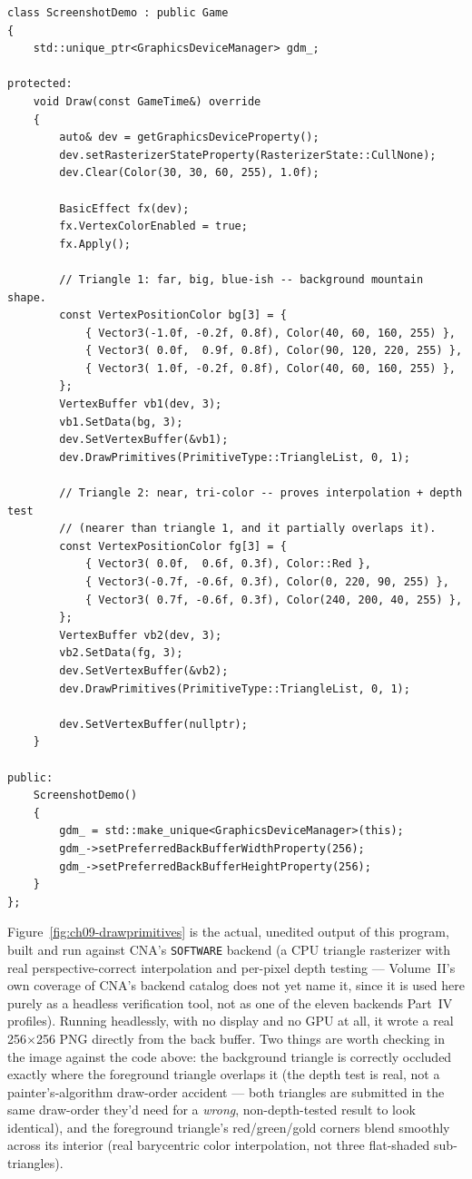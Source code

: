 \begin{lstlisting}
class ScreenshotDemo : public Game
{
    std::unique_ptr<GraphicsDeviceManager> gdm_;

protected:
    void Draw(const GameTime&) override
    {
        auto& dev = getGraphicsDeviceProperty();
        dev.setRasterizerStateProperty(RasterizerState::CullNone);
        dev.Clear(Color(30, 30, 60, 255), 1.0f);

        BasicEffect fx(dev);
        fx.VertexColorEnabled = true;
        fx.Apply();

        // Triangle 1: far, big, blue-ish -- background mountain shape.
        const VertexPositionColor bg[3] = {
            { Vector3(-1.0f, -0.2f, 0.8f), Color(40, 60, 160, 255) },
            { Vector3( 0.0f,  0.9f, 0.8f), Color(90, 120, 220, 255) },
            { Vector3( 1.0f, -0.2f, 0.8f), Color(40, 60, 160, 255) },
        };
        VertexBuffer vb1(dev, 3);
        vb1.SetData(bg, 3);
        dev.SetVertexBuffer(&vb1);
        dev.DrawPrimitives(PrimitiveType::TriangleList, 0, 1);

        // Triangle 2: near, tri-color -- proves interpolation + depth test
        // (nearer than triangle 1, and it partially overlaps it).
        const VertexPositionColor fg[3] = {
            { Vector3( 0.0f,  0.6f, 0.3f), Color::Red },
            { Vector3(-0.7f, -0.6f, 0.3f), Color(0, 220, 90, 255) },
            { Vector3( 0.7f, -0.6f, 0.3f), Color(240, 200, 40, 255) },
        };
        VertexBuffer vb2(dev, 3);
        vb2.SetData(fg, 3);
        dev.SetVertexBuffer(&vb2);
        dev.DrawPrimitives(PrimitiveType::TriangleList, 0, 1);

        dev.SetVertexBuffer(nullptr);
    }

public:
    ScreenshotDemo()
    {
        gdm_ = std::make_unique<GraphicsDeviceManager>(this);
        gdm_->setPreferredBackBufferWidthProperty(256);
        gdm_->setPreferredBackBufferHeightProperty(256);
    }
};
\end{lstlisting}

Figure~\ref{fig:ch09-drawprimitives} is the actual, unedited output of this program, built and
run against CNA's \texttt{SOFTWARE} backend (a CPU triangle rasterizer with real
perspective-correct interpolation and per-pixel depth testing --- Volume~II's own coverage of
CNA's backend catalog does not yet name it, since it is used here purely as a headless
verification tool, not as one of the eleven backends Part~IV profiles). Running headlessly, with
no display and no GPU at all, it wrote a real 256$\times$256 PNG directly from the back buffer.
Two things are worth checking in the image against the code above: the background triangle is
correctly occluded exactly where the foreground triangle overlaps it (the depth test is real,
not a painter's-algorithm draw-order accident --- both triangles are submitted in the same
draw-order they'd need for a \emph{wrong}, non-depth-tested result to look identical), and the
foreground triangle's red/green/gold corners blend smoothly across its interior (real
barycentric color interpolation, not three flat-shaded sub-triangles).


